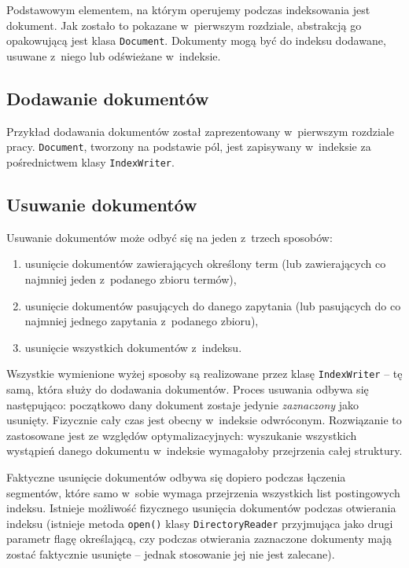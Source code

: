 Podstawowym elementem, na którym operujemy podczas indeksowania jest dokument. Jak zostało to pokazane w~pierwszym rozdziale, abstrakcją go opakowującą jest klasa \texttt{Document}. Dokumenty mogą być do indeksu dodawane, usuwane z~niego lub odświeżane w~indeksie.

\subsection{Dodawanie dokumentów}

Przykład dodawania dokumentów został zaprezentowany w~pierwszym rozdziale pracy. \texttt{Document}, tworzony na podstawie pól, jest zapisywany w~indeksie za pośrednictwem klasy \texttt{IndexWriter}.

\subsection{Usuwanie dokumentów}

Usuwanie dokumentów może odbyć się na jeden z~trzech sposobów: 
\begin{enumerate}
 \item usunięcie dokumentów zawierających określony term (lub zawierających co najmniej jeden z~podanego zbioru termów),
 \item usunięcie dokumentów pasujących do danego zapytania (lub pasujących do co najmniej jednego zapytania z~podanego zbioru),
 \item usunięcie wszystkich dokumentów z~indeksu.
\end{enumerate}

Wszystkie wymienione wyżej sposoby są realizowane przez klasę \texttt{IndexWriter} -- tę samą, która służy do dodawania dokumentów. Proces usuwania odbywa się następująco: początkowo dany dokument zostaje jedynie \emph{zaznaczony} jako usunięty. Fizycznie cały czas jest obecny w~indeksie odwróconym. Rozwiązanie to zastosowane jest ze względów optymalizacyjnych: wyszukanie wszystkich wystąpień danego dokumentu w~indeksie wymagałoby przejrzenia całej struktury. 

Faktyczne usunięcie dokumentów odbywa się dopiero podczas łączenia segmentów, które samo w~sobie wymaga przejrzenia wszystkich list postingowych indeksu. Istnieje możliwość fizycznego usunięcia dokumentów podczas otwierania indeksu (istnieje metoda \texttt{open()} klasy \texttt{DirectoryReader} przyjmująca jako drugi parametr flagę określającą, czy podczas otwierania zaznaczone dokumenty mają zostać faktycznie usunięte -- jednak stosowanie jej nie jest zalecane).

